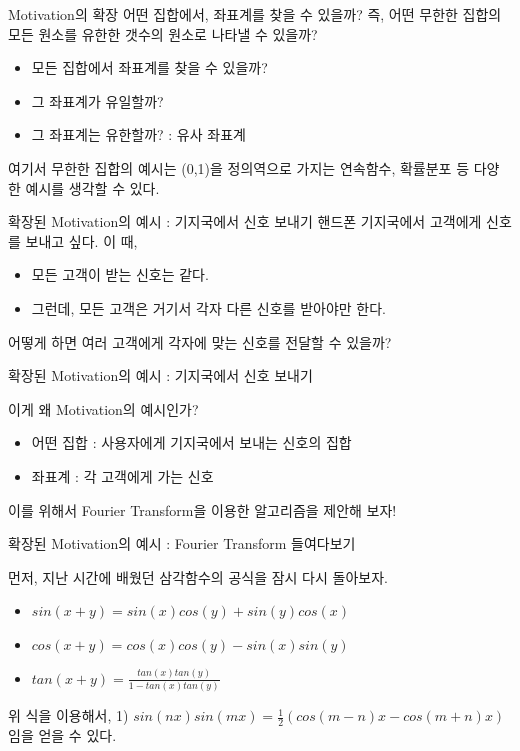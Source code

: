 \documentclass{beamer}
\begin{document}
\begin{frame}{Motivation의 확장}
어떤 집합에서, 좌표계를 찾을 수 있을까? 즉, 어떤 무한한 집합의 모든 원소를 유한한 갯수의 원소로 나타낼 수 있을까? 

\begin{itemize} 
\item 모든 집합에서 좌표계를 찾을 수 있을까? 
\item 그 좌표계가 유일할까? 
\item 그 좌표계는 유한할까? : 유사 좌표계
\end{itemize}

여기서 무한한 집합의 예시는 (0,1)을 정의역으로 가지는 연속함수, 확률분포 등 다양한 예시를 생각할 수 있다. 

\end{frame}

\begin{frame}{확장된 Motivation의 예시 : 기지국에서 신호 보내기} 
핸드폰 기지국에서 고객에게 신호를 보내고 싶다. 이 때, 

\begin{itemize} 
\item 모든 고객이 받는 신호는 같다. 
\item 그런데, 모든 고객은 거기서 각자 다른 신호를 받아야만 한다. 
\end{itemize}

어떻게 하면 여러 고객에게 각자에 맞는 신호를 전달할 수 있을까? 
\end{frame}

\begin{frame}{확장된 Motivation의 예시 : 기지국에서 신호 보내기} 

이게 왜 Motivation의 예시인가? 
\begin{itemize} 
\item 어떤 집합 : 사용자에게 기지국에서 보내는 신호의 집합 
\item 좌표계 : 각 고객에게 가는 신호 
\end{itemize}
이를 위해서 Fourier Transform을 이용한 알고리즘을 제안해 보자! 

\end{frame}

\begin{frame}{확장된 Motivation의 예시 : Fourier Transform 들여다보기} 

먼저, 지난 시간에 배웠던 삼각함수의 공식을 잠시 다시 돌아보자. 

\begin{itemize}
\item $sin(x+y) = sin(x)cos(y) + sin(y)cos(x)$
\item $cos(x+y) = cos(x)cos(y) - sin(x)sin(y)$
\item $tan(x+y) = \frac{tan(x)tan(y)}{1-tan(x)tan(y)}$
\end{itemize}

위 식을 이용해서, 1) $sin(nx)sin(mx) = \frac{1}{2} (cos(m-n)x - cos(m+n)x)$임을 얻을 수 있다. 

\end{frame}
\end{document}
